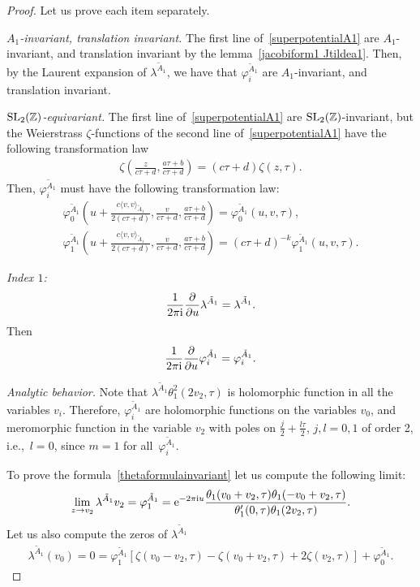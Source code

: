 \documentclass[pdftex]{sigma}%
\numberwithin{equation}{section}
\begin{document}
\begin{proof}
Let us prove each item separately.

\textit{$A_1$-invariant, translation invariant.}
The first line of~\eqref{superpotentialA1} are $A_1$-invariant, and translation invariant by the lemma~\eqref{jacobiform1 Jtildea1}. Then, by the Laurent expansion of $\lambda^{\tilde A_1}$, we have that $\varphi_i^{\tilde A_1}$ are $A_1$-invariant, and translation invariant.

\textit{${\rm SL}_2(\mathbb{Z})$-equivariant.}
The first line of~\eqref{superpotentialA1} are ${\rm SL}_2(\mathbb{Z})$-invariant, but the Weierstrass $\zeta$-functions of the second line of~\eqref{superpotentialA1} have the following transformation law
\begin{gather*}
\zeta\left(\frac{z}{c\tau+d},\frac{a\tau+b}{c\tau+d}\right)=(c\tau+d)\zeta(z,\tau).
\end{gather*}
Then, $\varphi_i^{\tilde A_1}$ must have the following transformation law:
\begin{gather*}
\varphi_0^{\tilde A_1}\left(u+\frac{c\langle v,v \rangle_{\tilde A_1}}{2(c\tau+d)},\frac{v}{c\tau+d},\frac{a\tau+b}{c\tau+d}\right)=\varphi_0^{\tilde A_1}(u,v,\tau),
\\
\varphi_1^{\tilde A_1}\left(u+\frac{c\langle v,v\rangle_{\tilde A_1}}{2(c\tau+d)},\frac{v}{c\tau+d},\frac{a\tau+b}{c\tau+d}\right)=(c\tau+d)^{-k}\varphi_1^{\tilde A_1}(u,v,\tau).
\end{gather*}

\textit{Index $1$:}
\begin{gather*}
\frac{1}{2\pi {\rm i}}\frac{\partial}{\partial u}\lambda^{\tilde A_1}=\lambda^{\tilde A_1}.
\end{gather*}
Then
\begin{gather*}
\frac{1}{2\pi {\rm i}}\frac{\partial}{\partial u}\varphi_i^{\tilde A_1}=\varphi_i^{\tilde A_1}.
\end{gather*}

\textit{Analytic behavior.}
Note that $\lambda^{\tilde A_1}\theta_1^2(2v_2,\tau)$ is holomorphic function in all the variables $v_i$. Therefore, $\varphi_i^{\tilde A_1}$ are holomorphic functions on the variables $v_0$, and meromorphic function in the variable $v_{2}$ with poles on $\frac{j}{2}+\frac{l\tau}{2}$, $j,l=0,1$ of order 2, i.e.,~$l=0$, since $m=1$ for all~$\varphi_i^{\tilde A_1}$.

To prove the formula~\eqref{thetaformulainvariant} let us compute the following limit:
\begin{gather*}
\lim_{z\to v_2}\lambda^{\tilde A_1}v_2=\varphi_1^{\tilde A_1}
={\rm e}^{-2\pi {\rm i} u}\frac{\theta_1(v_0+v_2,\tau)\theta_1(-v_0+v_2,\tau)}
{\theta^{\prime}_1(0,\tau)\theta_1(2v_2,\tau)}.
\end{gather*}
Let us also compute the zeros of $\lambda^{\tilde A_1}$
\begin{gather*}
\lambda^{\tilde A_1}(v_0)=0=\varphi_{1}^{\tilde A_1}\left[\zeta(v_0-v_2,\tau)-\zeta(v_0+v_{2},\tau)+2\zeta(v_2,\tau)\right]+\varphi_0^{\tilde A_1}.
\tag*{\qed}
\end{gather*}
\renewcommand{\qed}{}
\end{proof}
\end{document}
